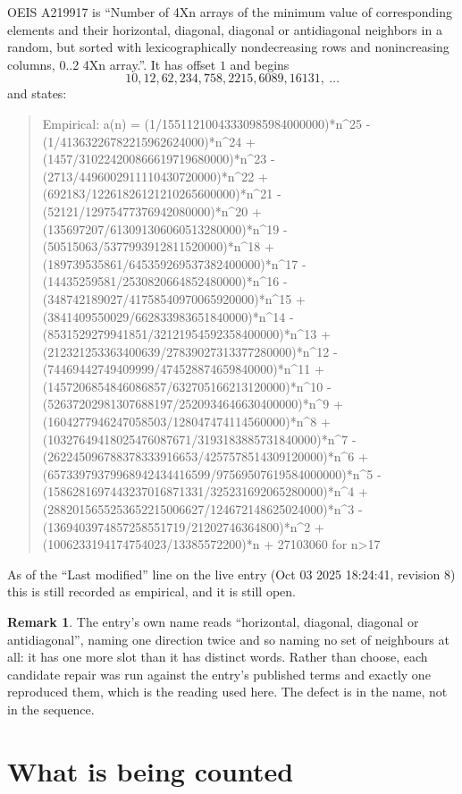 \documentclass[11pt,a4paper]{article}
\theoremstyle{plain}
\theoremstyle{definition}
\newtheorem{remark}[theorem]{Remark}
\begin{document}
OEIS A219917 is ``Number of 4Xn arrays of the minimum value of corresponding elements and their horizontal, diagonal, diagonal or antidiagonal neighbors in a random, but sorted with lexicographically nondecreasing rows and nonincreasing columns, 0..2 4Xn array.''. It has offset $1$ and begins
\[
10, 12, 62, 234, 758, 2215, 6089, 16131,\ \dots
\]
and states:
\begin{quote}
Empirical: a(n) = (1/15511210043330985984000000)*n\^{}25 - (1/41363226782215962624000)*n\^{}24 + (1457/310224200866619719680000)*n\^{}23 - (2713/4496002911110430720000)*n\^{}22 + (692183/12261826121210265600000)*n\^{}21 - (52121/12975477376942080000)*n\^{}20 + (135697207/613091306060513280000)*n\^{}19 - (50515063/5377993912811520000)*n\^{}18 + (189739535861/645359269537382400000)*n\^{}17 - (14435259581/2530820664852480000)*n\^{}16 - (348742189027/41758540970065920000)*n\^{}15 + (3841409550029/662833983651840000)*n\^{}14 - (8531529279941851/32121954592358400000)*n\^{}13 + (212321253363400639/27839027313377280000)*n\^{}12 - (74469442749409999/474528874659840000)*n\^{}11 + (1457206854846086857/632705166213120000)*n\^{}10 - (52637202981307688197/2520934646630400000)*n\^{}9 + (1604277946247058503/128047474114560000)*n\^{}8 + (10327649418025476087671/3193183885731840000)*n\^{}7 - (262245096788378333916653/4257578514309120000)*n\^{}6 + (65733979379968942434416599/97569507619584000000)*n\^{}5 - (1586281697443237016871331/325231692065280000)*n\^{}4 + (2882015655253652215006627/124672148625024000)*n\^{}3 - (1369403974857258551719/21202746364800)*n\^{}2 + (1006233194174754023/13385572200)*n + 27103060 for n>17
\end{quote}
As of the ``Last modified'' line on the live entry (Oct 03 2025 18:24:41, revision 8)
this is still recorded as empirical, and it is still open.

\begin{remark}
The entry's own name reads ``horizontal, diagonal, diagonal or antidiagonal'', naming one direction twice and so naming no set of
neighbours at all: it has one more slot than it has distinct words. Rather than choose, each
candidate repair was run against the entry's published terms and exactly one reproduced them,
which is the reading used here. The defect is in the name, not in the sequence.
\end{remark}

\section{What is being counted}
\end{document}
